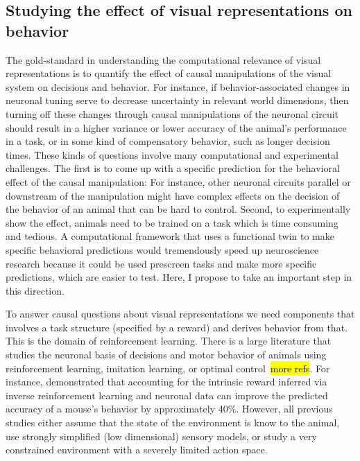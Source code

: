 \documentclass[B2,COG]{ercgrant}
\begin{document}
\subsection{Studying the effect of visual representations on behavior}
The gold-standard in understanding the computational relevance of visual representations  is to quantify the effect of causal manipulations of the visual system on decisions and behavior. 
For instance, if behavior-associated changes in neuronal tuning serve to decrease uncertainty in relevant world dimensions, then turning off these changes through causal manipulations of the neuronal circuit should result in a higher variance or lower accuracy of the animal's performance in a task, or in some kind of compensatory behavior, such as longer decision times.
These kinds of questions involve many computational and experimental challenges. 
The first is to come up with a specific prediction for the behavioral effect of the causal manipulation: For instance, other neuronal circuits parallel or downstream of the manipulation might have complex effects on the decision of the behavior of an animal that can be hard to control. 
Second, to experimentally show the effect, animals need to be trained on a task which is time consuming and tedious. 
A computational framework that uses a functional twin to make specific behavioral predictions would tremendously speed up neuroscience research because it could be used prescreen tasks and make more specific predictions, which are easier to test. 
Here, I propose to take an important step in this direction. 

To answer causal questions about visual representations we need components that involves a task structure (\eg specified by a reward) and derives behavior from that. 
This is the domain of reinforcement learning.
There is a large literature that studies the neuronal basis of decisions and motor behavior of animals using reinforcement learning, imitation learning, or optimal control~\parencite{Schultz1997-xu,Todorov2004-yb}\hl{more refs}.
For instance, \textcite{Kalweit2022-ev} demonstrated that accounting for the intrinsic reward inferred via inverse reinforcement learning and neuronal data can improve the predicted accuracy of a mouse's behavior by approximately 40\%.
However, all previous studies either assume that the state of the environment is know to the animal, use strongly simplified (low dimensional) sensory models, or study a very constrained environment with a severely limited action space. 
\end{document}

